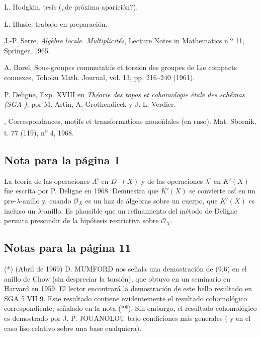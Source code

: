 \begin{enumerate}[label={[\arabic*]}]
\item L. Hodgkin, tesis (¿de próxima aparición?).
\item L. Illusie, trabajo en preparación.
\item J.-P. Serre, \emph{Algèbre locale. Multiplicités}, Lecture Notes in Mathematics n.º 11, Springer, 1965.
\item A. Borel, Sous-groupes commutatifs et torsion des groupes de Lie compacts connexes, Tohoku Math. Journal, vol. 13, pp. 216--240 (1961).
\item[{[16]}(*)] P. Deligne, Exp. XVIII en \emph{Théorie des topos et cohomologie étale des schémas (SGA )}, por M. Artin, A. Grothendieck y J. L. Verdier. %
\item[{[17]}(*)] , Correspondances, motifs et transformations monoïdales (en ruso). Mat. Sbornik, t. 77 (119), n\textsuperscript{o} 4, 1968. %
\end{enumerate}


\subsection*{Nota para la página 1}

La teoría de las operaciones $\Lambda^i$ en $D^-(X)$ y de las operaciones
$\lambda^i$ en $K'(X)$ fue escrita por P. Deligne en 1968. Demuestra que
$K'(X)$ se convierte así en un pre-$\lambda$-anillo y, cuando
$\mathcal O_X$ es un haz de álgebras sobre un cuerpo, que $K'(X)$ es incluso
un $\lambda$-anillo. Es plausible que un refinamiento del método de Deligne
permita prescindir de la hipótesis restrictiva sobre $\mathcal O_X$.

\subsection*{Notas para la página 11}

\noindent(*) (Abril de 1969) D. MUMFORD nos señala una demostración de (9.6)
en el anillo de Chow (sin despreciar la torsión), que obtuvo en un seminario
en Harvard en 1959. El lector encontrará la demostración de este bello
resultado en SGA 5 VII 9. Este resultado contiene evidentemente el resultado
cohomológico correspondiente, señalado en la nota (**). Sin embargo, el
resultado cohomológico es demostrado por J. P. JOUANOLOU bajo condiciones
más generales ( y en el caso liso relativo %
sobre una base cualquiera).

